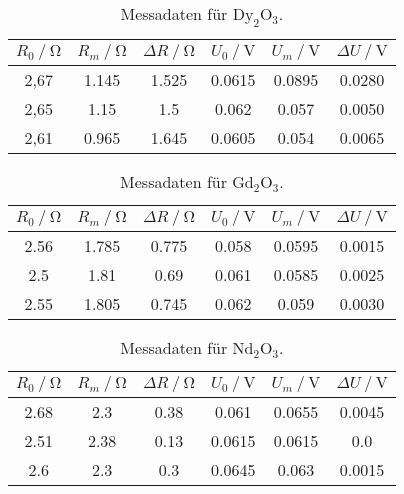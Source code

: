 \begin{table}[H]
    \centering
    \caption{Messadaten für $\text{Dy}_2 \text{O}_3$.}
    \label{tab:tab3}
    \begin{tabular}{S S S S S S}
      \toprule
        {$ R_0 \mathbin{/} \unit{\ohm} $}&{$R_m \mathbin{/} \unit{\ohm} $}&{$ \Delta R \mathbin{/} \unit{\ohm}$}&{$ U_0 \mathbin{/} \unit{\volt}$}&{$U_m \mathbin{/} \unit{\volt}$}&{$\Delta U \mathbin{/} \unit{\volt}$}\\
        \midrule
        {2,67} & {1.145}&  {1.525}&{0.0615}&{0.0895}&{0.0280}\\
        {2,65} & {1.15} &   {1.5} &{0.062} &{0.057} &{0.0050}\\
        {2,61} & {0.965}&  {1.645}&{0.0605}&{0.054} &{0.0065}\\
      \bottomrule
    \end{tabular}
\end{table}

\begin{table}[H]
    \centering
    \caption{Messadaten für $\text{Gd}_2 \text{O}_3$.}
    \label{tab:tab4}
    \begin{tabular}{S S S S S S}
      \toprule
        {$ R_0 \mathbin{/} \unit{\ohm} $}&{$R_m \mathbin{/} \unit{\ohm} $}&{$ \Delta R \mathbin{/} \unit{\ohm}$}&{$ U_0 \mathbin{/} \unit{\volt}$}&{$U_m \mathbin{/} \unit{\volt}$}&{$\Delta U \mathbin{/} \unit{\volt}$}\\
        \midrule
        {2.56} & {1.785}&  {0.775}&{0.058}&{0.0595}&{0.0015}\\
        {2.5}  & { 1.81}&   {0.69} &{0.061}&{0.0585} &{0.0025}\\
        {2.55} & {1.805}&  {0.745}&{0.062}&{0.059} &{0.0030}\\
      \bottomrule
    \end{tabular}
\end{table}

\begin{table}[H]
    \centering
    \caption{Messadaten für $\text{Nd}_2 \text{O}_3$.}
    \label{tab:tab5}
    \begin{tabular}{S S S S S S}
      \toprule
        {$ R_0 \mathbin{/} \unit{\ohm} $}&{$R_m \mathbin{/} \unit{\ohm} $}&{$ \Delta R \mathbin{/} \unit{\ohm}$}&{$ U_0 \mathbin{/} \unit{\volt}$}&{$U_m \mathbin{/} \unit{\volt}$}&{$\Delta U \mathbin{/} \unit{\volt}$}\\
        \midrule
        {2.68} & {2.3} &  {0.38}&{0.061} &{0.0655}&{0.0045}\\
        {2.51} & {2.38}&  {0.13}&{0.0615}&{0.0615}&{0.0}\\
        {2.6}  & {2.3} &  {0.3} &{0.0645}&{0.063} &{0.0015}\\
        \bottomrule
    \end{tabular}
\end{table}


